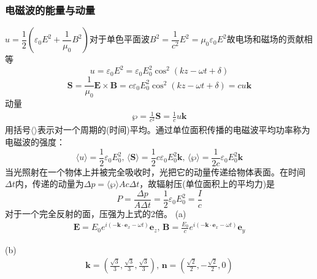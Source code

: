 \subsubsection{电磁波的能量与动量}
$u=\dfrac{1}{2}\left(\varepsilon_0E^2+\dfrac{1}{\mu_0}B^2\right)$对于单色平面波$B^2=\dfrac{1}{c^2}E^2=\mu_0\varepsilon_0E^2$故电场和磁场的贡献相等
\begin{equation}
    u=\varepsilon_0E^2=\varepsilon_0E_0^2\cos^2(kz-\omega t+\delta)
\end{equation}
\begin{equation}
    \boldsymbol{S}=\frac{1}{\mu_0}\boldsymbol{E}\times\boldsymbol{B}
    =c\varepsilon_0E_0^2\cos^2(kz-\omega t+\delta)
    =cu\boldsymbol{k}
\end{equation}
动量
\begin{align*}
    \boldsymbol{\wp}=\frac{1}{c^2}\boldsymbol{S}=\frac{1}{c}u\boldsymbol{k}
\end{align*}
用括号$\langle \rangle$表示对一个周期的(时间)平均。通过单位面积传播的电磁波平均功率称为电磁波的强度：
\begin{equation}
    \langle u\rangle=\frac{1}{2}\varepsilon_0E_0^2,\, 
    \langle \boldsymbol{S}\rangle=\frac{1}{2}c\varepsilon_0E_0^2\boldsymbol{k},\, 
    \langle \boldsymbol{\wp}\rangle=\frac{1}{2c}\varepsilon_0E_0^2\boldsymbol{k}
\end{equation}
当光照射在一个物体上并被完全吸收时，光把它的动量传递给物体表面。在时间$\Delta t$内，传递的动量为$\Delta p=\langle \boldsymbol{\wp}\rangle Ac\Delta t$，故辐射压(单位面积上的平均力)是
\begin{equation}
    P=\frac{\Delta p}{A\Delta t}=\frac{1}{2}\varepsilon_0E_0^2=\frac{I}{c}
\end{equation}
对于一个完全反射的面，压强为上式的2倍。
(a)\begin{align*}
    \boldsymbol{E}=E_0e^{i\left(-\boldsymbol{k}\cdot\boldsymbol{e}_x-\omega t\right)}\boldsymbol{e}_z,\, \boldsymbol{B}=\frac{E_0}{c}e^{i\left(-\boldsymbol{k}\cdot\boldsymbol{e}_x-\omega t\right)}\boldsymbol{e}_y
\end{align*}

(b)\begin{align*}
    \boldsymbol{k}=\left(\frac{\sqrt{3}}{3},\frac{\sqrt{3}}{3},\frac{\sqrt{3}}{3}\right),\, \boldsymbol n=\left(\frac{\sqrt{2}}{2},-\frac{\sqrt{2}}{2},0\right)
\end{align*}


